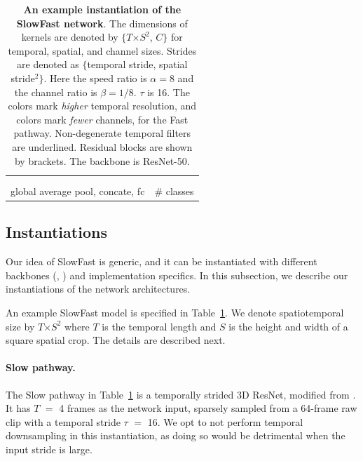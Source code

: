 \documentclass[10pt,twocolumn,letterpaper]{article}
\def\x{$\times$}
\renewcommand{\omega}{\alpha}
\renewcommand{\phi}{\beta}
\begin{document}
\begin{table}[t]
{\begin{tabular}{c|c|c|c}
				&  & \\
				&  & \\
				\hline
				\multicolumn{3}{c|}{global average pool, concate, fc}  & \# classes \\
		\end{tabular}}
		\vspace{.1em}
		\caption{\textbf{An example instantiation of the SlowFast network}. 
			The dimensions of kernels are denoted by $\{$$T$\x $S^2$, $C$$\}$ for temporal, spatial, and channel sizes.
			Strides are denoted as $\{$temporal stride, spatial stride$^2$$\}$.
			Here the speed ratio is $\omega=8$ and the channel ratio is $\phi=1/8$. $\tau$ is 16. The  colors mark \emph{higher} temporal resolution, and  colors mark \emph{fewer} channels, for the Fast pathway. 
			Non-degenerate temporal filters are underlined.
			Residual blocks are shown by brackets. The backbone is ResNet-50.
		}
		\label{tab:arch}
			\vspace{-.8em}
	\end{table}
	
	\subsection{Instantiations}  \label{sec:realization}
	
	Our idea of SlowFast is generic, and it can be instantiated with different backbones (\eg, \cite{Simonyan2015,Szegedy2015,He2016}) and implementation specifics. 
	In this subsection, we describe our instantiations of the network architectures.
	
	An example SlowFast model is specified in Table~\ref{tab:arch}.
	We denote spatiotemporal size by $T$\x $S^2$ where $T$ is the temporal length and $S$ is the height and width of a square spatial crop. The details are described next.
	
	\paragraph{Slow pathway.}
	The Slow pathway in Table~\ref{tab:arch} is a temporally strided 3D ResNet, modified from \cite{Feichtenhofer2016a}. It has $T$ $=$ 4 frames as the network input, sparsely sampled from a 64-frame raw clip with a temporal stride $\tau$ $=$ 16. We opt to not perform temporal downsampling in this instantiation, as doing so would be detrimental when the input stride is large.
	
\end{document}
